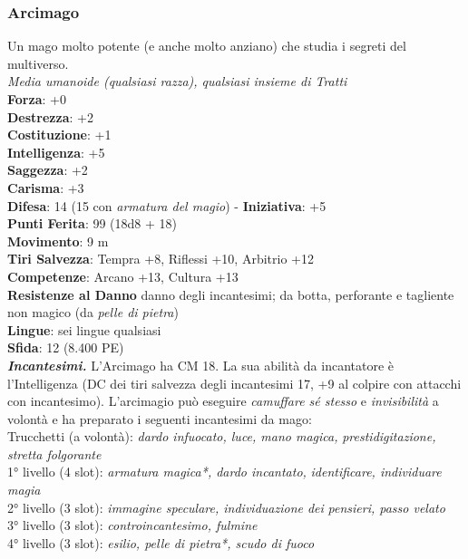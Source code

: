 \begin{multicols}{2}
\subsubsection{Arcimago}
Un mago molto potente (e anche molto anziano) che studia i segreti del multiverso.\\
\emph{Media umanoide (qualsiasi razza), qualsiasi insieme di Tratti}\\
\textbf{Forza}: +0\\
\textbf{Destrezza}: +2\\
\textbf{Costituzione}: +1\\
\textbf{Intelligenza}: +5\\
\textbf{Saggezza}: +2\\
\textbf{Carisma}: +3\\
\textbf{Difesa}: 14 (15 con \emph{armatura del magio}) - \textbf{Iniziativa}: +5\\
\textbf{Punti Ferita}: 99 (18d8 + 18)\\
\textbf{Movimento}: 9 m\\
\textbf{Tiri Salvezza}: Tempra +8, Riflessi +10, Arbitrio +12 \\
\textbf{Competenze}: Arcano +13, Cultura +13\\
\textbf{Resistenze al Danno} danno degli incantesimi; da botta, perforante e tagliente non magico (da \emph{pelle di pietra})\\
\textbf{Lingue}: sei lingue qualsiasi\\
\textbf{Sfida}: 12 (8.400 PE)\smallskip\\
\emph{\textbf{Incantesimi.}} L'Arcimago ha CM 18. La sua abilità da incantatore è l'Intelligenza (DC dei tiri salvezza degli incantesimi 17, +9 al colpire con attacchi con incantesimo). L'arcimagio può eseguire \emph{camuffare sé stesso} e \emph{invisibilità} a volontà e ha preparato i seguenti incantesimi da mago:\\
Trucchetti (a volontà): \emph{dardo infuocato, luce, mano magica,} \emph{prestidigitazione, stretta folgorante}\\
1° livello (4 slot): \emph{armatura magica*, dardo incantato,} \emph{identificare, individuare magia}\\
2° livello (3 slot): \emph{immagine speculare, individuazione dei} \emph{pensieri, passo velato}\\
3° livello (3 slot): \emph{controincantesimo, fulmine}\\
4° livello (3 slot): \emph{esilio, pelle di pietra*, scudo di fuoco}\\

\end{multicols}
